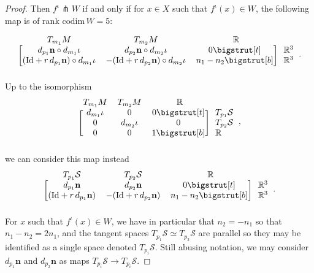 \documentclass[11pt]{article}
\newcommand{\R}{\mathbb{R}}
\newcommand{\io}{\iota}
\newcommand{\nbf}{\mathbf{n}}
\newcommand{\Surf}{\mathcal{S}}
\newcommand{\Id}{\mathrm{Id}}
\newcommand\topstrut[1][1.2ex]{\setlength\bigstrutjot{#1}{\bigstrut[t]}}
\newcommand\botstrut[1][1.2ex]{\setlength\bigstrutjot{#1}{\bigstrut[b]}}
\theoremstyle{plain}
\theoremstyle{definition}
\theoremstyle{remark}
\begin{document}
\begin{proof}
Then $f^\io \pitchfork W$ if and only if for $x \in X$ such that $f^\io(x) \in W$, the following map is of rank $\mathrm{codim} \, W = 5$:

\begin{equation*}
	\begin{blockarray}{*{3}{c} l}
		\begin{block}{cccl}
			T_{m_1} M & T_{m_2} M & ~~\R~~ & \\
		\end{block}
		\begin{block}{[ccc] l}
			d_{p_1} \nbf \circ d_{m_1} \io & d_{p_2} \nbf \circ d_{m_2} \io & 0 \topstrut  & \R^3 \\
			(\Id + r \, d_{p_1} \nbf) \circ d_{m_1} \io & - (\Id + r \, d_{p_2} \nbf) \circ d_{m_2} \io & n_1 - n_2 \botstrut & \R^3 \\
		\end{block}
	\end{blockarray}.
\end{equation*}
Up to the isomorphism 
\begin{equation*}
	\begin{blockarray}{*{3}{c} l}
		\begin{block}{cccl}
			T_{m_1} M & T_{m_2} M & ~~\R~~ & \\
		\end{block}
		\begin{block}{[ccc] l}
			d_{m_1} \io & 0 & 0 \topstrut  & T_{p_1} \Surf \\
			0 & d_{m_2} \io & 0 & T_{p_2} \Surf \\
            0 & 0 & 1 \botstrut & \R \\
		\end{block}
	\end{blockarray},
\end{equation*} 
we can consider this map instead
\begin{equation*}
	\begin{blockarray}{*{3}{c} l}
		\begin{block}{cccl}
			T_{p_1} \Surf & T_{p_2} \Surf & ~~\R~~ & \\
		\end{block}
		\begin{block}{[ccc] l}
			d_{p_1} \nbf  & d_{p_2} \nbf & 0 \topstrut  & \R^3 \\
			(\Id + r \, d_{p_1} \nbf)  & - (\Id + r \, d_{p_2} \nbf)  & n_1 - n_2 \botstrut & \R^3 \\
		\end{block}
	\end{blockarray}.
\end{equation*}
For $x$ such that $f^\io(x) \in W$, we have in particular that $n_2 = - n_1$ so that $n_1 - n_2 = 2 n_1$, and the tangent spaces $T_{p_1} \Surf \simeq T_{p_2} \Surf$ are parallel so they may be identified as a single space denoted $T_{p_i} \Surf$. Still abusing notation, we may consider $d_{p_1} \nbf$ and $d_{p_2} \nbf$ as maps $T_{p_i} \Surf \to T_{p_i} \Surf$.


\end{proof}
\end{document}
